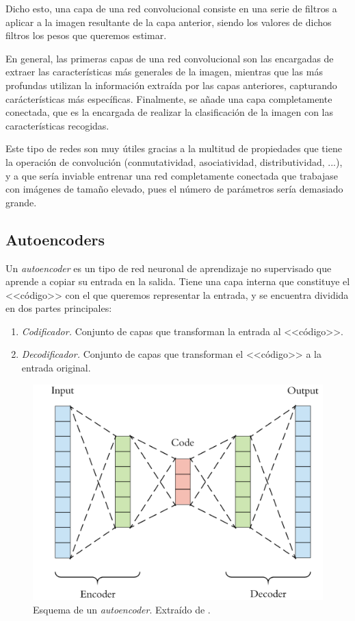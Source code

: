 \documentclass[
  a4paper,
  12pt,
  spanish,
]{scrartcl}
\theoremstyle{teorema-style}
\begin{document}
Dicho esto, una capa de una red convolucional consiste en una serie de filtros a aplicar a la imagen resultante de la capa anterior, siendo los valores de dichos filtros los pesos que queremos estimar.

En general, las primeras capas de una red convolucional son las encargadas de extraer las características más generales de la imagen, mientras que las más profundas utilizan la información extraída por las capas anteriores, capturando carácterísticas más específicas. Finalmente, se añade una capa completamente conectada, que es la encargada de realizar la clasificación de la imagen con las características recogidas.

Este tipo de redes son muy útiles gracias a la multitud de propiedades que tiene la operación de convolución (conmutatividad, asociatividad, distributividad, ...), y a que sería inviable entrenar una red completamente conectada que trabajase con imágenes de tamaño elevado, pues el número de parámetros sería demasiado grande.

\subsection{Autoencoders}

Un \textit{autoencoder} es un tipo de red neuronal de aprendizaje no supervisado que aprende a copiar su entrada en la
salida. Tiene una capa interna que constituye el <<código>> con
el que queremos representar la entrada, y se encuentra dividida en dos partes principales:
\begin{enumerate}
  \item \textit{Codificador. } Conjunto de capas que transforman la entrada al <<código>>.
  \item \textit{Decodificador. } Conjunto de capas que transforman el <<código>> a la entrada original.
\end{enumerate}

\begin{figure}[h]
  \centering
  \includegraphics[width=.7\textwidth]{img/autoencoder}
  \caption{Esquema de un \textit{autoencoder}. Extraído de \parencite{arden_autoencoder_2017}.}
  \label{fig:autoencoder}
\end{figure}
\end{document}
